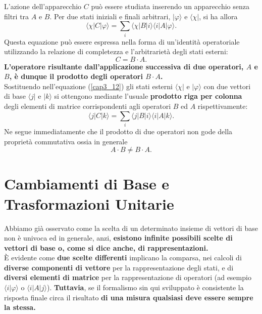 \documentclass[a4paper,12pt,oneside]{book}
\begin{document}
L'azione dell'apparecchio $C$ può essere studiata inserendo un apparecchio senza filtri tra $A$ e $B$. Per due stati iniziali e finali arbitrari, $| \varphi \rangle $ e $\langle \chi |$, si ha allora
	\begin{equation}
		\boxed{
			\langle \chi | C | \varphi \rangle = \sum \limits_{i} \langle \chi | B | i \rangle \langle i | A | \varphi \rangle .
			}
	\label{cap3_12}
	\end{equation}
Questa equazione può essere espressa nella forma di un'identità operatoriale utilizzando la relazione di completezza e l'arbitrarietà degli stati esterni:
	\begin{equation}
		\boxed{\boxed{
		C= B \cdot A .
		}}
	\end{equation}
\textbf{L'operatore risultante dall'applicazione successiva di due operatori, $A$ e $B$, è dunque il prodotto degli operatori $B \cdot A$.}\\
Sostituendo nell'equazione (\ref{cap3_12}) gli stati esterni $\langle \chi |$ e $ | \varphi \rangle $ con due vettori di base $\langle j |$ e $| k \rangle$ si ottengono mediante l'usuale \textbf{prodotto riga per colonna} degli elementi di matrice corrispondenti agli operatori $B$ ed $A$ rispettivamente:
	\begin{equation}
		\langle j | C | k \rangle  = \sum \limits_{i} \langle j | B | i \rangle \langle i | A | k \rangle .
	\end{equation}
Ne segue immediatamente che il prodotto di due operatori non gode della proprietà commutativa ossia in generale
	\begin{equation}
		\boxed{\boxed{
			A \cdot B \neq B \cdot A . 
			}}
	\end{equation}

\section{Cambiamenti di Base e Trasformazioni Unitarie}

Abbiamo già osservato come la scelta di un determinato insieme di vettori di base non è univoca ed in generale, anzi, \textbf{esistono infinite possibili scelte di vettori di base o, come si dice anche, di rappresentazioni.}\\
È evidente come \textbf{due scelte differenti }implicano la comparsa, nei calcoli di \textbf{diverse componenti di vettore} per la rappresentazione degli stati, e di \textbf{diversi elementi di matrice} per la rappresentazione di operatori (ad esempio $\langle i | \varphi \rangle $ o  $ \langle i | A | j \rangle $). \textbf{Tuttavia}, se il formalismo sin qui sviluppato è consistente la risposta finale circa il risultato \textbf{di una misura qualsiasi deve essere sempre la stessa.}\\
\end{document}
